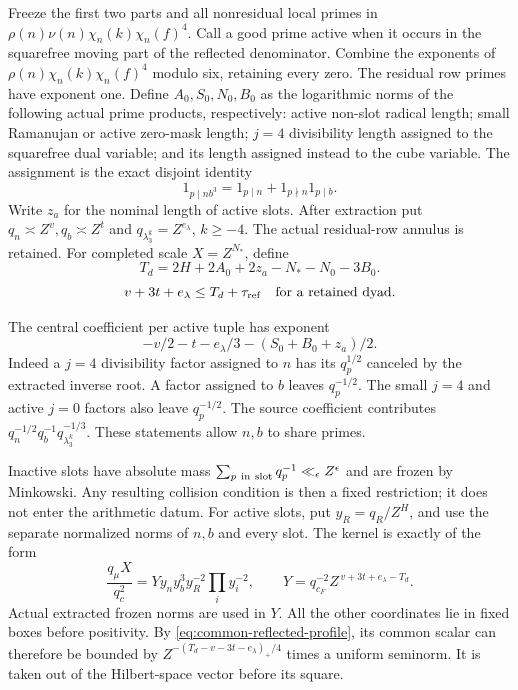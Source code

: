 \documentclass[12pt]{article}
\begin{document}
Freeze the first two parts and all nonresidual local primes in
\(\rho(n)\nu(n)\chi_n(k)\chi_n(f)^4\).
Call a good prime active when it occurs in the squarefree moving
part of the reflected denominator.  Combine the exponents of
\(\rho(n)\chi_n(k)\chi_n(f)^4\) modulo six, retaining every zero.
The residual row primes have exponent one.  Define
\(A_0,S_0,N_0,B_0\) as the logarithmic norms of the following
actual prime products, respectively:
active non-slot radical length; small Ramanujan or active
zero-mask length; \(j=4\) divisibility length assigned to the
squarefree dual variable; and its length assigned instead to
the cube variable.
The assignment is the exact disjoint identity
\[
 1_{p\mid nb^3}=1_{p\mid n}+1_{p\nmid n}1_{p\mid b}.
\]
Write \(z_a\) for the nominal length of active slots.
After extraction put \(q_n\asymp Z^v,q_b\asymp Z^t\) and
\(q_{\lambda_3^k}=Z^{e_\lambda}\), \(k\ge-4\).
The actual residual-row annulus is retained.
For completed scale \(X=Z^{N_*}\), define
\[
 T_d=2H+2A_0+2z_a-N_*-N_0-3B_0.
\]
\begin{equation}\label{own:retained-energy-dyad}
 v+3t+e_\lambda\le T_d+\tau_{\rm ref}
            \quad\hbox{for a retained dyad}.
\end{equation}

The central coefficient per active tuple has exponent
\[
 -v/2-t-e_\lambda/3-(S_0+B_0+z_a)/2.
 \tag{C6}\label{eq:energy-coefficient}
\]
Indeed a \(j=4\) divisibility factor assigned to \(n\)
has its \(q_p^{1/2}\) canceled by the extracted inverse root.
A factor assigned to \(b\) leaves \(q_p^{-1/2}\).
The small \(j=4\) and active \(j=0\) factors also leave
\(q_p^{-1/2}\).
The source coefficient contributes
\(q_n^{-1/2}q_b^{-1}q_{\lambda_3^k}^{-1/3}\).
These statements allow \(n,b\) to share primes.

Inactive slots have absolute mass
\(\sum_{p\ {\rm in\ slot}}q_p^{-1}\ll_\epsilon Z^\epsilon\)
and are frozen by Minkowski.  Any resulting collision condition is
then a fixed restriction; it does not enter the arithmetic datum.
For active slots, put \(y_R=q_R/Z^H\), and use the separate
normalized norms of \(n,b\) and every slot.
The kernel is exactly of the form
\[
 \frac{q_\mu X}{q_c^2}
   =Yy_ny_b^3y_R^{-2}\prod_i y_i^{-2},\qquad
 Y=q_{c_F}^{-2}Z^{\,v+3t+e_\lambda-T_d}.
 \tag{C7}
\]
Actual extracted frozen norms are used in \(Y\).
All the other coordinates lie in fixed boxes before positivity.
By \eqref{eq:common-reflected-profile}, its common scalar can
therefore be bounded by
\(Z^{-(T_d-v-3t-e_\lambda)_+/4}\) times a uniform seminorm.
It is taken out of the Hilbert-space vector before its square.
\end{document}
